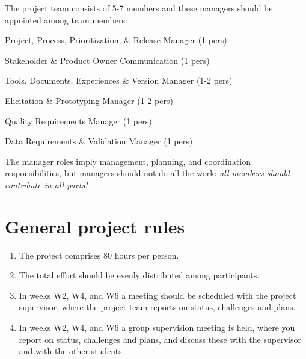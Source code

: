    \noindent The project team consists of 5-7 members and these managers should be appointed among team members:

   \begin{description}[noitemsep]
   \item[P3RM] Project, Process, Prioritization, \& Release Manager (1 pers)
   \item[SPOC] Stakeholder \& Product Owner Communication (1 pers)
   \item[TDEVM] Tools, Documents, Experiences \& Version Manager (1-2 pers)
   \item[EPM] Elicitation \& Prototyping Manager (1-2 pers)
   \item[QRM] Quality Requirements Manager (1 pers)
   \item[DRVM] Data Requirements \& Validation Manager (1 pers)
   \end{description}

   \noindent The manager roles imply management, planning, and coordination responsibilities, but managers should not do all the work: {\it all members should contribute in all parts!}
\fi 

\section{General project rules}
\begin{enumerate}[noitemsep]
\item The project comprises 80 hours per person.
\ifteknolog
   \item The total effort should be evenly distributed among participants.
   \item In weeks W2, W4, and W6 a meeting should be scheduled with the project supervisor, where the project team reports on status, challenges and plans.
 \else
 \item In weeks W2, W4, and W6 a group supervision meeting is held, where you report on status, challenges and plans, and discuss these with the supervisor and with the other students.
 \fi
\end{enumerate}

